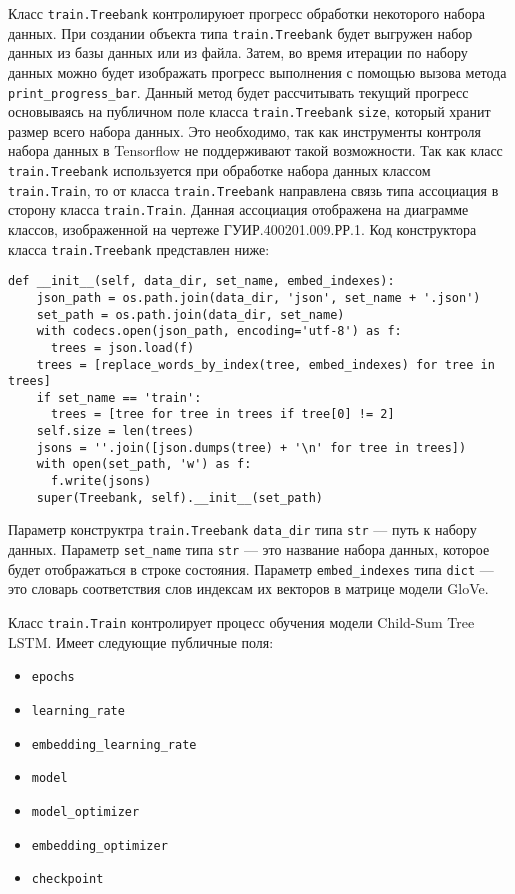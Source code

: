 Класс \texttt{train.Treebank} контролируюет прогресс обработки некоторого набора данных. При создании объекта типа \texttt{train.Treebank} будет выгружен набор данных из базы данных или из файла. Затем, во время итерации по набору данных можно будет изображать прогресс выполнения с помощью вызова метода \texttt{print\_progress\_bar}. Данный метод будет рассчитывать текущий прогресс основываясь на публичном поле класса \texttt{train.Treebank} \texttt{size}, который хранит размер всего набора данных. Это необходимо, так как инструменты контроля набора данных в Tensorflow не поддерживают такой возможности. Так как класс \texttt{train.Treebank} используется при обработке набора данных классом \texttt{train.Train}, то от класса \texttt{train.Treebank} направлена связь типа ассоциация в сторону класса \texttt{train.Train}. Данная ассоциация отображена на диаграмме классов, изображенной на чертеже ГУИР.400201.009.РР.1. Код конструктора класса \texttt{train.Treebank} представлен ниже:
\medskip
\begin{lstlisting}[style=Python]
  def __init__(self, data_dir, set_name, embed_indexes):
    json_path = os.path.join(data_dir, 'json', set_name + '.json')
    set_path = os.path.join(data_dir, set_name)
    with codecs.open(json_path, encoding='utf-8') as f:
      trees = json.load(f)
    trees = [replace_words_by_index(tree, embed_indexes) for tree in trees]
    if set_name == 'train':
      trees = [tree for tree in trees if tree[0] != 2]
    self.size = len(trees)
    jsons = ''.join([json.dumps(tree) + '\n' for tree in trees])
    with open(set_path, 'w') as f:
      f.write(jsons)
    super(Treebank, self).__init__(set_path)
\end{lstlisting}
\medskip

Параметр конструктра \texttt{train.Treebank} \texttt{data\_dir} типа \texttt{str} --- путь к набору данных. Параметр \texttt{set\_name} типа \texttt{str} --- это название набора данных, которое будет отображаться в строке состояния. Параметр \texttt{embed\_indexes} типа \texttt{dict} --- это словарь соответствия слов индексам их векторов в матрице модели GloVe.

Класс \texttt{train.Train} контролирует процесс обучения модели Child-Sum Tree LSTM\@. Имеет следующие публичные поля:
\begin{itemize}
\item \texttt{epochs}
\item \texttt{learning\_rate}
\item \texttt{embedding\_learning\_rate}
\item \texttt{model}
\item \texttt{model\_optimizer}
\item \texttt{embedding\_optimizer}
\item \texttt{checkpoint}
\end{itemize}

